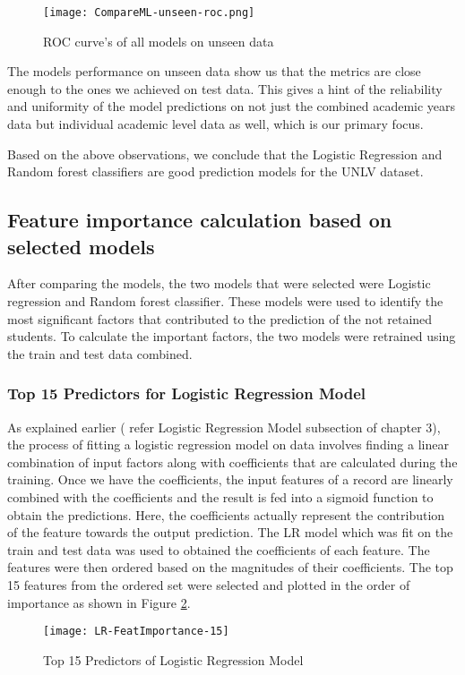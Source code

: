 \documentclass[11pt,openright]{report}
\begin{document}
 \begin{figure}[!htb]
	\centering
	\texttt{[image: CompareML-unseen-roc.png]}
	\caption{ROC curve's of all models on unseen data}
	\label{fig:comparison_roc}
\end{figure} 

The models performance on unseen data show us that the metrics are close enough to the ones we achieved on test data. This gives a hint of the reliability and uniformity of the model predictions on not just the combined academic years data but individual academic level data as well, which is our primary focus.

Based on the above observations, we conclude that the Logistic Regression and Random forest classifiers are good prediction models for the UNLV dataset.



\subsection{Feature importance calculation based on selected models} 
After comparing the models, the two models that were selected were Logistic regression and Random forest classifier. These models were used to identify the most significant factors that contributed to the prediction of the not retained students. To calculate the important factors, the two models were retrained using the train and test data combined.

\subsubsection{Top 15 Predictors for Logistic Regression Model}

As explained earlier ( refer Logistic Regression Model subsection of chapter 3), the process of fitting a logistic regression model on data involves finding a linear combination of input factors along with coefficients that are calculated during the training. Once we have the coefficients, the input features of a record are linearly combined with the coefficients and the result is fed into a sigmoid function to obtain the predictions. Here, the coefficients actually represent the contribution of the feature towards the output prediction. The LR model which was fit on the train and test data was used to obtained the coefficients of each feature. The features were then ordered based on the magnitudes of their coefficients. The top 15 features from the ordered set were selected and plotted in the order of importance as shown in Figure \ref{fig:lr_predictors}.
 \begin{figure}[!ht]
	\centering
	\texttt{[image: LR-FeatImportance-15]}
	\caption{Top 15 Predictors of Logistic Regression Model}
	\label{fig:lr_predictors}
\end{figure} 
\end{document}
